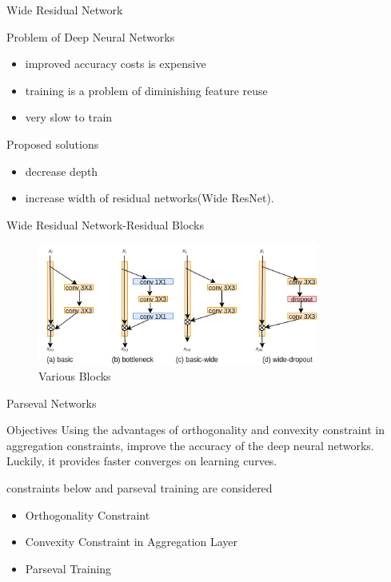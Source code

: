 \documentclass{beamer}		%
\begin{document}
\begin{frame}{Wide Residual Network}
\begin{block}{Problem of Deep Neural Networks}
\begin{itemize}
    \item improved accuracy costs is expensive
    \item training is a problem of diminishing feature reuse
    \item very slow to train
\end{itemize}
\end{block}
\pause
\begin{block}{Proposed solutions}
\begin{itemize}
  \item decrease depth
  \item increase width of residual networks(Wide ResNet).
\end{itemize}
\end{block}
\end{frame}
\begin{frame}{Wide Residual Network-Residual Blocks}
\begin{figure}	%
\includegraphics[height=4cm]{Model-WideResNet.png}
\caption{Various Blocks}
\end{figure}
\end{frame}	
\begin{frame}{Parseval Networks}	
\begin{block}{Objectives}
Using the advantages of orthogonality and convexity constraint in aggregation constraints, improve the accuracy of the deep neural networks. Luckily, it provides faster converges on learning curves.
\end{block}
 constraints below and parseval training are considered
\begin{itemize}
\item Orthogonality Constraint
\item Convexity Constraint in Aggregation Layer
\item Parseval Training
\end{itemize}
\end{frame}	
\end{document}
